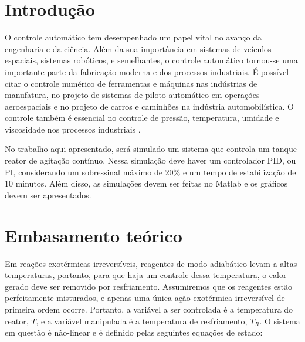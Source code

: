 \documentclass[
	12pt,				%
	openany,			%
	oneside,			%
	a4paper,			%
	english,			%
	french,				%
	spanish,			%
	brazil,				%
	]{abntex2}
\begin{document}
{%
\textual

\chapter*[Introdução]{Introdução}

O controle automático tem desempenhado um papel vital no avanço da engenharia e da ciência. Além da sua importância em sistemas de veículos espaciais, sistemas robóticos, e semelhantes, o controle automático tornou-se uma importante parte da fabricação moderna e dos processos industriais. É possível citar o controle numérico de ferramentas e máquinas nas indústrias de manufatura, no projeto de sistemas de piloto automático em operações aeroespaciais e no projeto de carros e caminhões na indústria automobilística. O controle também é essencial no controle de pressão, temperatura, umidade e viscosidade nos processos industriais \cite{ogata}.

No trabalho aqui apresentado, será simulado um sistema que controla um tanque reator de agitação contínuo. Nessa simulação deve haver um controlador PID, ou PI, considerando um sobressinal máximo de 20\% e um tempo de estabilização de 10 minutos. Além disso, as simulações devem ser feitas no Matlab e os gráficos devem ser apresentados. 




\chapter{Embasamento teórico}

Em reações exotérmicas irreversíveis, reagentes de modo adiabático levam a altas temperaturas, portanto, para que haja um controle dessa temperatura, o calor gerado deve ser removido por resfriamento. Assumiremos que os reagentes estão perfeitamente misturados, e apenas uma única ação exotérmica irreversível de primeira ordem ocorre. Portanto, a variável a ser controlada é a temperatura do reator, $T$, e a variável manipulada é a temperatura de resfriamento, $T_R$. O sistema em questão é não-linear e é definido pelas seguintes equações de estado:

}
\end{document}
